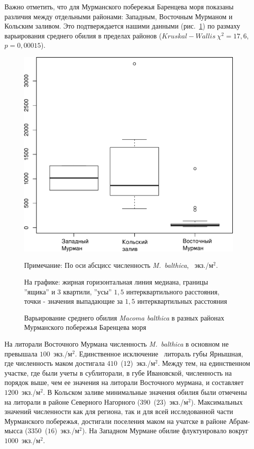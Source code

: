 \documentclass[12pt, a4paper]{disser}
\begin{document}
Важно отметить, что для Мурманского побережья Баренцева моря показаны различия между отдельными районами: Западным, Восточным Мурманом и Кольским заливом. Это подтверждается нашими данными (рис.~\ref{ris:N_region_Barents}) по размаху варьирования среднего обилия в пределах районов ($Kruskal-Wallis\ \chi^2 = 17,6$, $p = 0,00015$).
%
	\begin{figure}[h]
		\includegraphics{../All_N/Nmean_region_Barents1.pdf}
	\caption{Варьирование среднего обилия {\it Macoma balthica} в разных районах Мурманского побережья Баренцева моря}
	{\footnotesize Примечание: По оси абсцисс \textemdash численность {\it M.~balthica}, ~экз./м$^2$.

	На графике: жирная горизонтальная линия \textemdash медиана, границы ''ящика''  и 3 квартили, ''усы'' \textemdash $1,5$ интерквартильного расстояния, точки - значения выпадающие за $1,5$ интерквартильных расстояния}
	\label{ris:N_region_Barents}
	\end{figure}
%
На литорали Восточного Мурмана численность {\it M.~balthica} в основном не превышала $100$~экз./м$^2$. 
Единственное исключение \textemdash\ литораль губы Ярнышная, где численность маком достигала $410$~($12$)~экз./м$^2$. 
Между тем, на единственном участке, где были учеты в сублиторали, в губе Ивановской, численность на порядок выше, чем ее значения на литорали Восточного мурмана, и составляет $1200$~экз./м$^2$. 
В Кольском заливе минимальные значения обилия были отмечены на литорали в районе Северного Нагорного ($390$~($23$)~экз./м$^2$). 
Максимальных значений численности как для региона, так и для всей исследованной части Мурманского побережья, достигали поселения маком на учатске в районе Абрам-мысса ($3350$~($16$)~экз./м$^2$). 
На Западном Мурмане обилие флуктуировало вокруг $1000$~экз./м$^2$.  
\end{document}
